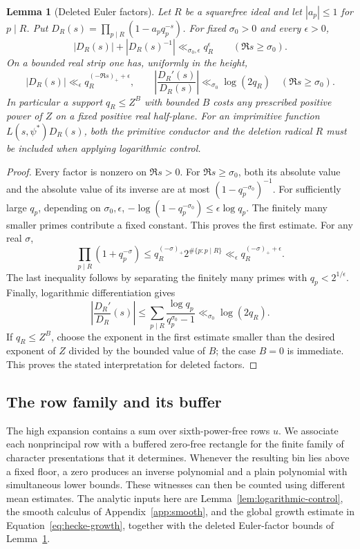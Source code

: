 \documentclass[12pt]{article}
\newtheorem{lemma}[theorem]{Lemma}
\begin{document}
\begin{lemma}[Deleted Euler factors]\label{lem:deleted-euler-factors}
Let $R$ be a squarefree ideal and let $|a_p|\le1$ for $p\mid R$.  Put
$D_R(s)=\prod_{p\mid R}(1-a_pq_p^{-s})$.  For fixed $\sigma_0>0$ and every
$\epsilon>0$,
\[
 |D_R(s)|+|D_R(s)^{-1}|\ll_{\sigma_0,\epsilon}q_R^\epsilon
       \qquad(\Re s\ge\sigma_0).
\]
On a bounded real strip one has, uniformly in the height,
\[
 |D_R(s)|\ll_\epsilon q_R^{(-\Re s)_++\epsilon},
 \qquad
 \left|\frac{D_R'(s)}{D_R(s)}\right|
 \ll_{\sigma_0}\log(2q_R)\quad(\Re s\ge\sigma_0).
\]
In particular a support $q_R\le Z^B$ with bounded $B$ costs any prescribed
positive power of $Z$ on a fixed positive real half-plane.  For an
imprimitive function $L(s,\psi^*)D_R(s)$, both the primitive conductor and
the deletion radical $R$ must be included when applying logarithmic control.
\end{lemma}

\begin{proof}
Every factor is nonzero on $\Re s>0$.  For $\Re s\ge\sigma_0$, both its
absolute value and the absolute value of its inverse are at most
$(1-q_p^{-\sigma_0})^{-1}$.  For sufficiently large $q_p$, depending on
$\sigma_0,\epsilon$,
$-\log(1-q_p^{-\sigma_0})\le\epsilon\log q_p$.  The finitely many smaller
primes contribute a fixed constant.  This proves the first estimate.
For any real $\sigma$,
\[
 \prod_{p\mid R}(1+q_p^{-\sigma})
 \le q_R^{(-\sigma)_+}2^{\#\{p:p\mid R\}}
 \ll_\epsilon q_R^{(-\sigma)_++\epsilon}.
\]
The last inequality follows by separating the finitely many primes with
$q_p<2^{1/\epsilon}$.  Finally, logarithmic differentiation gives
\[
 \left|\frac{D_R'}{D_R}(s)\right|
 \le\sum_{p\mid R}\frac{\log q_p}{q_p^{\sigma_0}-1}
 \ll_{\sigma_0}\log(2q_R).
\]
If $q_R\le Z^B$, choose the exponent in the first estimate smaller than the
desired exponent of $Z$ divided by the bounded value of $B$; the case $B=0$
is immediate.  This proves the stated interpretation for deleted factors.
\end{proof}
\subsection{The row family and its buffer}\label{sec:detector}

The high expansion contains a sum over sixth-power-free rows \(u\).
We associate each nonprincipal row with a buffered zero-free rectangle
for the finite family of character presentations that it determines.
Whenever the resulting bin lies above a fixed floor, a zero produces
an inverse polynomial and a plain polynomial with simultaneous lower
bounds.  These witnesses can then be counted using different mean
estimates.  The analytic inputs here are Lemma~\ref{lem:logarithmic-control},
the smooth calculus of Appendix~\ref{app:smooth}, and the global
growth estimate in Equation~\eqref{eq:hecke-growth}, together with the
deleted Euler-factor bounds of Lemma~\ref{lem:deleted-euler-factors}.
\end{document}
